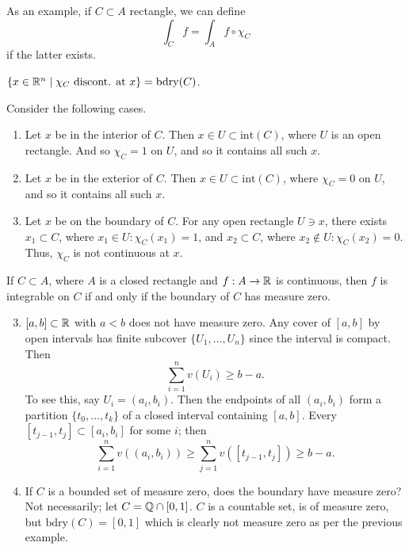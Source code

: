 \noindent As an example, if $C \subset A$ rectangle, we can define
\[ \int_C f = \int_A f \circ \chi_C \]
if the latter exists.
\begin{simplelemma}
    $\{x \in \mathbb R^n \mid \chi_C \text{ discont. at } x\} = \mathrm{bdry}(C)$.
\end{simplelemma} 
\noindent Consider the following cases.
\begin{enumerate}[label=(\roman*)]
    \item Let $x$ be in the interior of $C$. Then $x \in U \subset \mathrm{int}(C)$, where $U$ is an open rectangle. And so $\chi_C = 1$ on $U$, and so it contains all such $x$. 
    \item Let $x$ be in the exterior of $C$. Then $x \in U \subset \mathrm{int}(C)$, where $\chi_C = 0$ on $U$, and so it contains all such $x$.
    \item Let $x$ be on the boundary of $C$. For any open rectangle $U \ni x$, there exists $x_1 \subset C$, where $x_1 \in U : \chi_C(x_1) = 1$, and $x_2 \subset C$, where $x_2 \not\in U : \chi_C(x_2) = 0$. Thus, $\chi_C$ is not continuous at $x$.
\end{enumerate}
\begin{simplecor}
    If $C \subset A$, where $A$ is a closed rectangle and $f : A \to \mathbb R$ is continuous, then $f$ is integrable on $C$ if and only if the boundary of $C$ has measure zero.
\end{simplecor}
\begin{enumerate}[label=(\alph*)]
    \setcounter{enumi}{2}
    \item $[a, b] \subset \mathbb R$ with $a < b$ does not have measure zero. Any cover of $[a, b]$ by open intervals has finite subcover $\{U_1, \dots, U_n\}$ since the interval is compact. Then
    \[ \sum_{i=1}^n v(U_i) \geq b-a. \]
    To see this, say $U_i = (a_i, b_i)$. Then the endpoints of all $(a_i, b_i)$ form a partition $\{t_0, \dots, t_k\}$ of a closed interval containing $[a, b]$. Every $[t_{j-1}, t_j] \subset [a_i, b_i]$ for some $i$; then
    \[ \sum_{i=1}^n v((a_i, b_i)) \geq \sum_{j=1}^n v([t_{j-1}, t_j]) \geq b-a. \]
    \item If $C$ is a bounded set of measure zero, does the boundary have measure zero? Not necessarily; let $C = \mathbb Q \cap [0, 1]$. $C$ is a countable set, is of measure zero, but $\mathrm{bdry}(C) = [0, 1]$ which is clearly not measure zero as per the previous example.
\end{enumerate}